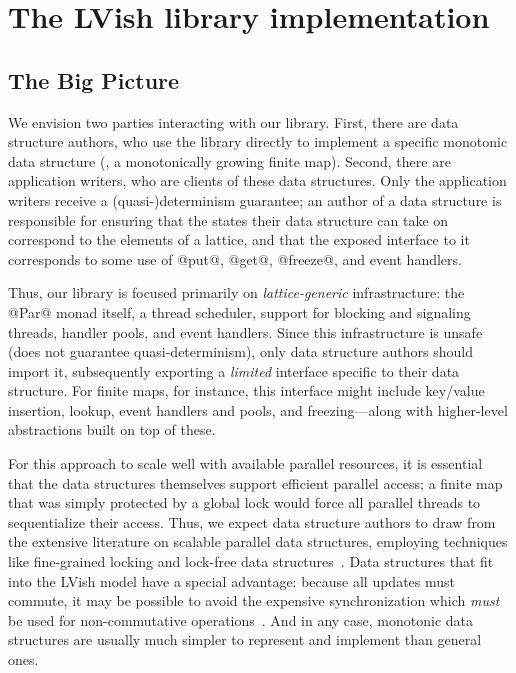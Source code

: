 \section{The LVish library implementation}\label{s:lvish-internals}


\subsection{The Big Picture}

We envision two parties interacting with our library.  First, there are data
structure authors, who use the library directly to implement a specific
monotonic data structure (\eg, a monotonically growing finite map).  Second,
there are application writers, who are clients of these data structures.  Only
the application writers receive a \mbox{(quasi-)determinism} guarantee; an author of a
data structure is responsible for ensuring that the states their data structure can take on
correspond to the elements of a lattice, and that the exposed interface to it corresponds to
some use of @put@, @get@, @freeze@, and event handlers.

Thus, our library is focused primarily on \emph{lattice-generic} infrastructure:
the @Par@ monad itself, a thread scheduler, support for blocking and signaling
threads, handler pools, and event handlers.  Since this infrastructure is unsafe
(does not guarantee quasi-determinism), only data structure authors should
import it, subsequently exporting a \emph{limited} interface specific to their
data structure.  For finite maps, for instance, this interface might include key/value
insertion, lookup, event handlers and pools, and freezing---along with
higher-level abstractions built on top of these.

For this approach to scale well with available parallel resources, it is
essential that the data structures themselves support efficient parallel access;
a finite map that was simply protected by a global lock would force all parallel
threads to sequentialize their access.  Thus, we expect data structure authors
to draw from the extensive literature on scalable parallel data structures,
employing techniques like fine-grained locking and lock-free data
structures~\cite{art}.  Data structures that fit into the LVish model have a
special advantage: because all updates must commute, it may be possible to avoid
the expensive synchronization which \emph{must} be used for non-commutative
operations~\cite{lawsOfOrder}.  And in any case, monotonic data structures are usually
much simpler to represent and implement than general ones.

